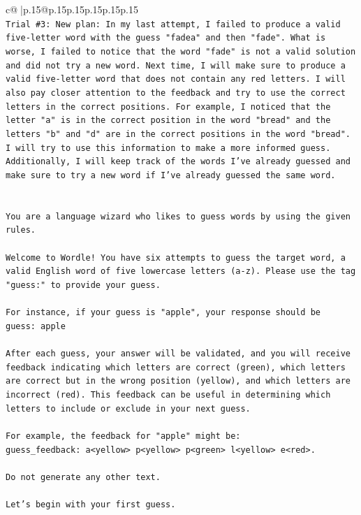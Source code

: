 \documentclass{article}
\begin{document}
{\begin{supertabular}{c@{$\;$}|p{.15\linewidth}@{}p{.15\linewidth}p{.15\linewidth}p{.15\linewidth}p{.15\linewidth}p{.15\linewidth}}
{{{\\ 
\texttt{Trial \#3: New plan: In my last attempt, I failed to produce a valid five{-}letter word with the guess "fadea" and then "fade". What is worse, I failed to notice that the word "fade" is not a valid solution and did not try a new word. Next time, I will make sure to produce a valid five{-}letter word that does not contain any red letters. I will also pay closer attention to the feedback and try to use the correct letters in the correct positions. For example, I noticed that the letter "a" is in the correct position in the word "bread" and the letters "b" and "d" are in the correct positions in the word "bread". I will try to use this information to make a more informed guess. Additionally, I will keep track of the words I've already guessed and make sure to try a new word if I've already guessed the same word.} \\
\\ 
\\ 
\texttt{You are a language wizard who likes to guess words by using the given rules.} \\
\\ 
\texttt{Welcome to Wordle! You have six attempts to guess the target word, a valid English word of five lowercase letters (a{-}z). Please use the tag "guess:" to provide your guess.} \\
\\ 
\texttt{For instance, if your guess is "apple", your response should be} \\
\texttt{guess: apple} \\
\\ 
\texttt{After each guess, your answer will be validated, and you will receive feedback indicating which letters are correct (green), which letters are correct but in the wrong position (yellow), and which letters are incorrect (red). This feedback can be useful in determining which letters to include or exclude in your next guess.} \\
\\ 
\texttt{For example, the feedback for "apple" might be:} \\
\texttt{guess\_feedback: a<yellow> p<yellow> p<green> l<yellow> e<red>.} \\
\\ 
\texttt{Do not generate any other text.} \\
\\ 
\texttt{Let's begin with your first guess.} \\
            }
        }
    }
     \\ \\


\end{supertabular}}
\end{document}
